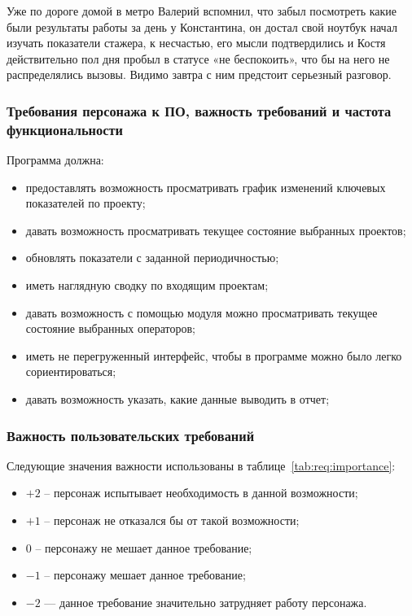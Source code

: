 Уже по дороге домой в метро Валерий вспомнил, что забыл посмотреть какие были результаты работы за день у Константина, он достал свой ноутбук начал изучать показатели стажера, к несчастью, его мысли подтвердились и Костя действительно пол дня пробыл в статусе «не беспокоить», что бы на него не распределялись вызовы. Видимо завтра с ним предстоит серьезный разговор.

\subsubsection{Требования персонажа к ПО, важность требований и частота функциональности}

Программа должна:
\begin{itemize}
    \item предоставлять возможность просматривать график изменений ключевых показателей по проекту;
    \item давать возможность просматривать текущее состояние выбранных проектов;
    \item обновлять показатели с заданной периодичностью;
    \item иметь наглядную сводку по входящим проектам;
    \item давать возможность с помощью модуля можно просматривать текущее состояние выбранных операторов;
    \item иметь не перегруженный интерфейс, чтобы в программе можно было легко сориентироваться;
    \item давать возможность указать, какие данные выводить в отчет;
\end{itemize}

\subsubsection{Важность пользовательских требований}

Следующие значения важности использованы в таблице~\ref{tab:req:importance}:
\begin{itemize}
    \item $+2$ -- персонаж испытывает необходимость в данной возможности;
    \item $+1$ -- персонаж не отказался бы от такой возможности;
    \item $0$ -- персонажу не мешает данное требование;
    \item $-1$ -- персонажу мешает данное требование;
    \item $-2$ --- данное требование значительно затрудняет работу персонажа.
\end{itemize}

